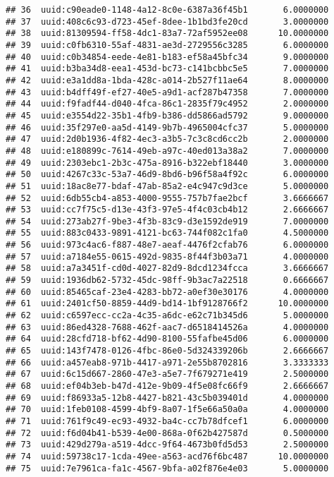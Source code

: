 \documentclass[
]{article}
\begin{document}
\begin{verbatim}
## 36  uuid:c90eade0-1148-4a12-8c0e-6387a36f45b1       6.0000000
## 37  uuid:408c6c93-d723-45ef-8dee-1b1bd3fe20cd       3.0000000
## 38  uuid:81309594-ff58-4dc1-83a7-72af5952ee08      10.0000000
## 39  uuid:c0fb6310-55af-4831-ae3d-2729556c3285       6.0000000
## 40  uuid:c0b34854-eede-4e81-b183-ef58a45bfc34       9.0000000
## 41  uuid:b3ba34d8-eea1-453d-bc73-c141bcbbc5e5       7.0000000
## 42  uuid:e3a1dd8a-1bda-428c-a014-2b527f11ae64       8.0000000
## 43  uuid:b4dff49f-ef27-40e5-a9d1-acf287b47358       7.0000000
## 44  uuid:f9fadf44-d040-4fca-86c1-2835f79c4952       2.0000000
## 45  uuid:e3554d22-35b1-4fb9-b386-dd5866ad5792       9.0000000
## 46  uuid:35f297e0-aa5d-4149-9b7b-4965004cfc37       5.0000000
## 47  uuid:2d0b1936-4f82-4ec3-a3b5-7c3c8cd6cc2b       2.0000000
## 48  uuid:e180899c-7614-49eb-a97c-40ed013a38a2       7.0000000
## 49  uuid:2303ebc1-2b3c-475a-8916-b322ebf18440       3.0000000
## 50  uuid:4267c33c-53a7-46d9-8bd6-b96f58a4f92c       6.0000000
## 51  uuid:18ac8e77-bdaf-47ab-85a2-e4c947c9d3ce       5.0000000
## 52  uuid:6db55cb4-a853-4000-9555-757b7fae2bcf       3.6666667
## 53  uuid:cc7f75c5-d13e-43f3-97e5-4f4c03cb4b12       2.6666667
## 54  uuid:273ab27f-9be3-4f3b-83c9-d3e1592de919       7.0000000
## 55  uuid:883c0433-9891-4121-bc63-744f082c1fa0       4.5000000
## 56  uuid:973c4ac6-f887-48e7-aeaf-4476f2cfab76       6.0000000
## 57  uuid:a7184e55-0615-492d-9835-8f44f3b03a71       4.0000000
## 58  uuid:a7a3451f-cd0d-4027-82d9-8dcd1234fcca       3.6666667
## 59  uuid:1936db62-5732-45dc-98ff-9b3ac7a22518       0.6666667
## 60  uuid:85465caf-23e4-4283-bb72-a0ef30e30176       4.0000000
## 61  uuid:2401cf50-8859-44d9-bd14-1bf9128766f2      10.0000000
## 62  uuid:c6597ecc-cc2a-4c35-a6dc-e62c71b345d6       5.0000000
## 63  uuid:86ed4328-7688-462f-aac7-d6518414526a       4.0000000
## 64  uuid:28cfd718-bf62-4d90-8100-55fafbe45d06       6.0000000
## 65  uuid:143f7478-0126-4fbc-86e0-5d324339206b       2.6666667
## 66  uuid:a457eab8-971b-4417-a971-2e55b8702816       3.3333333
## 67  uuid:6c15d667-2860-47e3-a5e7-7f679271e419       2.5000000
## 68  uuid:ef04b3eb-b47d-412e-9b09-4f5e08fc66f9       2.6666667
## 69  uuid:f86933a5-12b8-4427-b821-43c5b039401d       4.0000000
## 70  uuid:1feb0108-4599-4bf9-8a07-1f5e66a50a0a       4.0000000
## 71  uuid:761f9c49-ec93-4932-ba4c-cc7b78dfcef1       6.0000000
## 72  uuid:f6d04b41-b539-4e00-868a-0f62b427587d       0.5000000
## 73  uuid:429d279a-a519-4dcc-9f64-4673b0fd5d53       2.5000000
## 74  uuid:59738c17-1cda-49ee-a563-acd76f6bc487      10.0000000
## 75  uuid:7e7961ca-fa1c-4567-9bfa-a02f876e4e03       5.0000000

\end{verbatim}
\end{document}
